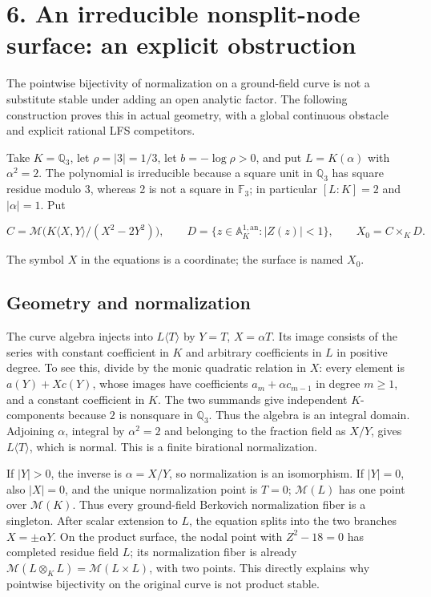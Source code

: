 \documentclass[11pt,a4paper]{article}
\begin{document}
\section*{6. An irreducible nonsplit-node surface: an explicit obstruction}

The pointwise bijectivity of normalization on a ground-field curve is not a substitute stable under adding an open analytic factor. The following construction proves this in actual geometry, with a global continuous obstacle and explicit rational LFS competitors.

Take \(K=\mathbb Q_3\), let \(\rho=|3|=1/3\), let \(b=-\log\rho>0\), and put \(L=K(\alpha)\) with \(\alpha^2=2\). The polynomial is irreducible because a square unit in \(\mathbb Q_3\) has square residue modulo 3, whereas 2 is not a square in \(\mathbb F_3\); in particular \([L:K]=2\) and \(|\alpha|=1\). Put

\[
C=\mathcal M\bigl(K\langle X,Y\rangle/(X^2-2Y^2)\bigr),
\qquad D=\{z\in\mathbb A_K^{1,\mathrm{an}}:|Z(z)|<1\},
\qquad X_0=C\times_K D.
\]

The symbol \(X\) in the equations is a coordinate; the surface is named \(X_0\).

\subsection*{Geometry and normalization}

The curve algebra injects into \(L\langle T\rangle\) by \(Y=T\), \(X=\alpha T\). Its image consists of the series with constant coefficient in \(K\) and arbitrary coefficients in \(L\) in positive degree. To see this, divide by the monic quadratic relation in \(X\): every element is \(a(Y)+Xc(Y)\), whose images have coefficients \(a_m+\alpha c_{m-1}\) in degree \(m\geq1\), and a constant coefficient in \(K\). The two summands give independent \(K\)-components because \(2\) is nonsquare in \(\mathbb Q_3\). Thus the algebra is an integral domain. Adjoining \(\alpha\), integral by \(\alpha^2=2\) and belonging to the fraction field as \(X/Y\), gives \(L\langle T\rangle\), which is normal. This is a finite birational normalization.

If \(|Y|>0\), the inverse is \(\alpha=X/Y\), so normalization is an isomorphism. If \(|Y|=0\), also \(|X|=0\), and the unique normalization point is \(T=0\); \(\mathcal M(L)\) has one point over \(\mathcal M(K)\). Thus every ground-field Berkovich normalization fiber is a singleton. After scalar extension to \(L\), the equation splits into the two branches \(X=\pm\alpha Y\). On the product surface, the nodal point with \(Z^2-18=0\) has completed residue field \(L\); its normalization fiber is already \(\mathcal M(L\otimes_K L)=\mathcal M(L\times L)\), with two points. This directly explains why pointwise bijectivity on the original curve is not product stable.
\end{document}
